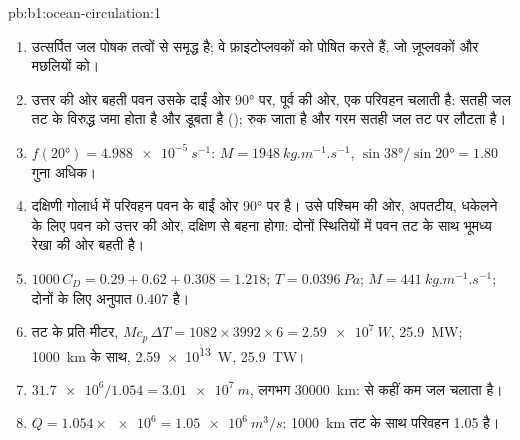 \begin{solution}{pb:b1:ocean-circulation:1}
\begin{enumerate}
  \item उत्सर्पित जल पोषक तत्वों से समृद्ध है; वे फ़ाइटोप्लवकों को पोषित करते हैं, जो ज़ूप्लवकों और मछलियों को।
  \item उत्तर की ओर बहती पवन उसके दाईं ओर \ang{90} पर, पूर्व की ओर, एक परिवहन चलाती है: सतही जल तट के विरुद्ध जमा होता है और डूबता है ();  रुक जाता है और गरम सतही जल तट पर लौटता है।
  \item $f(\ang{20}) = \qty{4.988e-5}{s^{-1}}$: $M = \qty{1948}{kg.m^{-1}.s^{-1}}$,
        $\sin\ang{38}/\sin\ang{20} = 1.80$ गुना अधिक।
  \item दक्षिणी गोलार्ध में परिवहन पवन के बाईं ओर \ang{90} पर है। उसे पश्चिम की ओर, अपतटीय, धकेलने के लिए पवन को उत्तर की ओर, दक्षिण से बहना होगा: दोनों स्थितियों में पवन तट के साथ भूमध्य रेखा की ओर बहती है।
  \item $1000\,C_D = 0.29 + 0.62 + 0.308 = 1.218$; $T = \qty{0.0396}{Pa}$; $M =
        \qty{441}{kg.m^{-1}.s^{-1}}$; दोनों के लिए अनुपात $0.407$ है।
  \item तट के प्रति मीटर, $M c_p\,\Delta T = 1082 \times 3992 \times 6 =
        \qty{2.59e7}{W}$, \qty{25.9}{MW}; \qty{1000}{km} के साथ, \qty{2.59e13}{W}, \qty{25.9}{TW}।
  \item $\num{31.7e6}/1.054 = \qty{3.01e7}{m}$, लगभग \qty{30000}{km}:   से कहीं कम जल चलाता है।
  \item $Q = 1.054 \times \num{e6} = \qty{1.05e6}{m^3/s}$: \qty{1000}{km} तट के साथ  परिवहन \qty{1.05}{\sverdrup} है।
\end{enumerate}
\end{solution}
